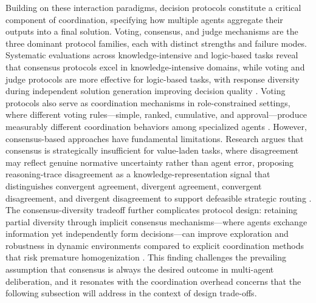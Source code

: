 \documentclass[11pt]{article}
\begin{document}
Building on these interaction paradigms, decision protocols constitute a critical component of coordination, specifying how multiple agents aggregate their outputs into a final solution. Voting, consensus, and judge mechanisms are the three dominant protocol families, each with distinct strengths and failure modes. Systematic evaluations across knowledge-intensive and logic-based tasks reveal that consensus protocols excel in knowledge-intensive domains, while voting and judge protocols are more effective for logic-based tasks, with response diversity during independent solution generation improving decision quality \cite{ref24}. Voting protocols also serve as coordination mechanisms in role-constrained settings, where different voting rules---simple, ranked, cumulative, and approval---produce measurably different coordination behaviors among specialized agents \cite{ref82}. However, consensus-based approaches have fundamental limitations. Research argues that consensus is strategically insufficient for value-laden tasks, where disagreement may reflect genuine normative uncertainty rather than agent error, proposing reasoning-trace disagreement as a knowledge-representation signal that distinguishes convergent agreement, divergent agreement, convergent disagreement, and divergent disagreement to support defeasible strategic routing \cite{ref83}. The consensus-diversity tradeoff further complicates protocol design: retaining partial diversity through implicit consensus mechanisms---where agents exchange information yet independently form decisions---can improve exploration and robustness in dynamic environments compared to explicit coordination methods that risk premature homogenization \cite{ref84}. This finding challenges the prevailing assumption that consensus is always the desired outcome in multi-agent deliberation, and it resonates with the coordination overhead concerns that the following subsection will address in the context of design trade-offs.
\end{document}
